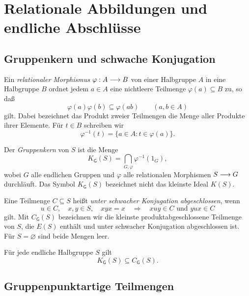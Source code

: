 \chapter{Relationale Abbildungen und endliche Abschlüsse}
\label{chap:b37-guide-relational}

\section{Gruppenkern und schwache Konjugation}

\begin{definition}
\label{def:b37-guide-relational-morphism}
Ein \emph{relationaler Morphismus} $\varphi:A\relbar\joinrel\to B$
von einer Halbgruppe $A$ in eine Halbgruppe $B$ ordnet jedem $a\in A$
eine nichtleere Teilmenge $\varphi(a)\subseteq B$ zu, so daß
\[
 \varphi(a)\varphi(b)\subseteq\varphi(ab)\qquad(a,b\in A)
\]
gilt. Dabei bezeichnet das Produkt zweier Teilmengen die Menge aller
Produkte ihrer Elemente. Für $t\in B$ schreiben wir
\[
 \varphi^{-1}(t)=\{a\in A:t\in\varphi(a)\}.
\]
\end{definition}

\begin{definition}
\label{def:b37-guide-group-kernel}
Der \emph{Gruppenkern} von $S$ ist die Menge
\[
 K_{\mathsf G}(S)=\bigcap_{G,\varphi}\varphi^{-1}(1_G),
\]
wobei $G$ alle endlichen Gruppen und $\varphi$ alle relationalen
Morphismen $S\relbar\joinrel\to G$ durchläuft.
Das Symbol $K_{\mathsf G}(S)$ bezeichnet nicht das kleinste Ideal $K(S)$.

Eine Teilmenge $C\subseteq S$ heißt \emph{unter schwacher Konjugation
abgeschlossen}, wenn
\[
 u\in C,\quad x,y\in S,\quad xyx=x
 \quad\Longrightarrow\quad xuy\in C\text{ und }yux\in C
\]
gilt. Mit $C_{\mathsf G}(S)$ bezeichnen wir die kleinste
produktabgeschlossene Teilmenge von $S$, die $E(S)$ enthält und unter
schwacher Konjugation abgeschlossen ist.
Für $S=\varnothing$ sind beide Mengen leer.
\end{definition}

\begin{theorem}
\label{thm:b37-guide-type-two}
Für jede endliche Halbgruppe $S$ gilt
\[
 K_{\mathsf G}(S)\subseteq C_{\mathsf G}(S).
\]
\cite{Ash1991,RhodesSteinberg2009}
\end{theorem}

\section{Gruppenpunktartige Teilmengen}

